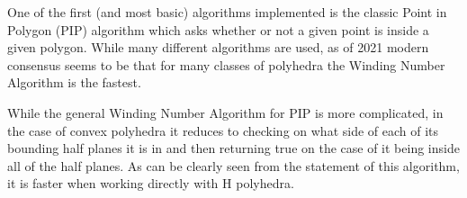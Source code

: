 \documentclass{article}
\theoremstyle{definition}
\begin{document}
One of the first (and most basic) algorithms implemented is the classic Point in Polygon (PIP) algorithm which asks whether or not a given point is inside a given polygon. While many different algorithms are used, as of 2021 modern consensus seems to be that for many classes of polyhedra the Winding Number Algorithm is the fastest\cite{topiwala2020polygon}.

While the general Winding Number Algorithm for PIP is more complicated, in the case of convex polyhedra it reduces to checking on what side of each of its bounding half planes it is in and then returning true on the case of it being inside all of the half planes. As can be clearly seen from the statement of this algorithm, it is faster when working directly with H polyhedra.



\end{document}
